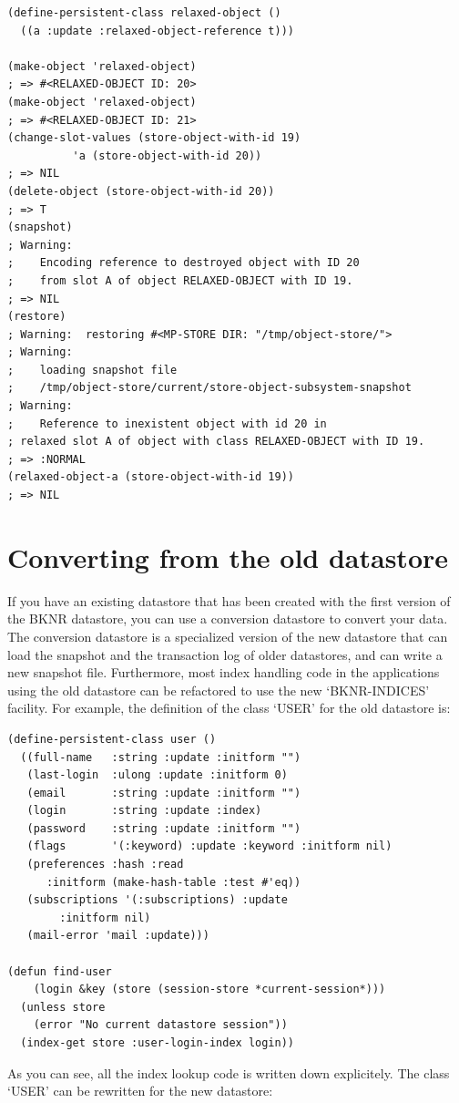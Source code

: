 \begin{Verbatim}[fontsize=\small,frame=leftline,framerule=0.9mm,rulecolor=\color{gray},framesep=5.1mm,xleftmargin=5mm,fontfamily=cmtt]
(define-persistent-class relaxed-object ()
  ((a :update :relaxed-object-reference t)))

(make-object 'relaxed-object)
; => #<RELAXED-OBJECT ID: 20>
(make-object 'relaxed-object)
; => #<RELAXED-OBJECT ID: 21>
(change-slot-values (store-object-with-id 19)
          'a (store-object-with-id 20))
; => NIL
(delete-object (store-object-with-id 20))
; => T
(snapshot)
; Warning:
;    Encoding reference to destroyed object with ID 20
;    from slot A of object RELAXED-OBJECT with ID 19.
; => NIL
(restore)
; Warning:  restoring #<MP-STORE DIR: "/tmp/object-store/">
; Warning:
;    loading snapshot file
;    /tmp/object-store/current/store-object-subsystem-snapshot
; Warning:
;    Reference to inexistent object with id 20 in
; relaxed slot A of object with class RELAXED-OBJECT with ID 19.
; => :NORMAL
(relaxed-object-a (store-object-with-id 19))
; => NIL
\end{Verbatim}


\section{ Converting from the old datastore}
If you have an existing datastore that has been created with the
first version of the BKNR datastore, you can use a conversion
datastore to convert your data. The conversion datastore is a
specialized version of the new datastore that can load the
snapshot and the transaction log of older datastores, and can
write a new snapshot file.
Furthermore, most index handling code in the applications using
the old datastore can be refactored to use the new `BKNR-INDICES'
facility. For example, the definition of the class `USER' for the
old datastore is:

\begin{Verbatim}[fontsize=\small,frame=leftline,framerule=0.9mm,rulecolor=\color{gray},framesep=5.1mm,xleftmargin=5mm,fontfamily=cmtt]
(define-persistent-class user ()
  ((full-name   :string :update :initform "")
   (last-login  :ulong :update :initform 0)
   (email       :string :update :initform "")
   (login       :string :update :index)
   (password    :string :update :initform "")
   (flags       '(:keyword) :update :keyword :initform nil)
   (preferences :hash :read
      :initform (make-hash-table :test #'eq))
   (subscriptions '(:subscriptions) :update
        :initform nil)
   (mail-error 'mail :update)))

(defun find-user
    (login &key (store (session-store *current-session*)))
  (unless store
    (error "No current datastore session"))
  (index-get store :user-login-index login))
\end{Verbatim}
As you can see, all the index lookup code is written down
explicitely. The class `USER' can be rewritten for the new
datastore:

